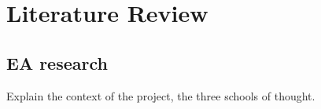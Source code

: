 
\chapter{Literature Review} %

\label{Chapter2} %



\section{EA research}




Explain the context of the project, the three schools of thought.

